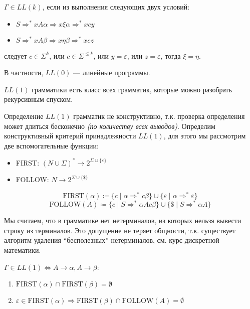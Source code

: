 \begin{definition}
    \(\Gamma \in LL(k)\), если из выполнения следующих двух условий:
    \begin{itemize}
        \item \(S \Rightarrow^* xA\alpha \Rightarrow x\xi\alpha \Rightarrow^* xcy\)
        \item \(S \Rightarrow^* xA\beta \Rightarrow x\eta\beta \Rightarrow^* xcz\)
    \end{itemize}
    следует \(c \in \Sigma^k\), или \(c \in \Sigma^{ \leq k}\), или \(y = \varepsilon\), или \(z = \varepsilon\), тогда \(\xi = \eta\).
\end{definition}

В частности, \(LL(0)\) --- линейные программы.

\(LL(1)\) грамматики есть класс всех грамматик, которые можно разобрать рекурсивным спуском.

Определение \(LL(1)\) грамматик не конструктивно, т.к. проверка определения может длиться бесконечно \textit{(по количеству всех выводов)}. Определим конструктивный критерий принадлежности \(LL(1)\), для этого мы рассмотрим две вспомогательные функции:

\begin{itemize}
    \item FIRST: \((N \cup \Sigma)^* \to 2^{\Sigma \cup \{\varepsilon\}}\)
    \item FOLLOW: \(N \to 2^{\Sigma \cup \{\$\}}\)
\end{itemize}
\[\mathrm{FIRST}(\alpha) \coloneqq \{c \mid \alpha \Rightarrow^* c \beta\} \cup \{\varepsilon \mid \alpha \Rightarrow^* \varepsilon\}\]
\[\mathrm{FOLLOW}(A) \coloneqq \{c \mid S \Rightarrow^* \alpha Ac\beta\} \cup \{\$ \mid S \Rightarrow^* \alpha A\}\]

\begin{remark}
    Мы считаем, что в грамматике нет нетерминалов, из которых нельзя вывести строку из терминалов. Это допущение не теряет общности, т.к. существует алгоритм удаления ``бесполезных'' нетерминалов, см. курс дискретной математики.
\end{remark}

\begin{theorem}
    \(\Gamma \in LL(1) \Leftrightarrow A \to \alpha, A \to \beta\):
    \begin{enumerate}
        \item \(\mathrm{FIRST}(\alpha) \cap \mathrm{FIRST}(\beta) = \emptyset\)
        \item \(\varepsilon \in \mathrm{FIRST}(\alpha) \Rightarrow \mathrm{FIRST}(\beta) \cap \mathrm{FOLLOW}(A) = \emptyset\)
    \end{enumerate}
\end{theorem}
